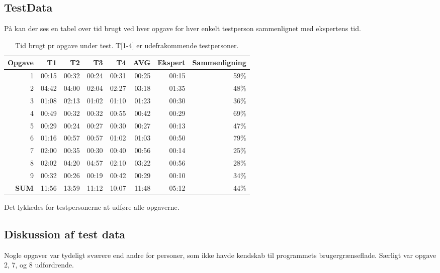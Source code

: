 \subsection{TestData}
På  kan der ses en tabel over tid brugt ved hver opgave for hver enkelt testperson sammenlignet med ekspertens tid.

\begin{table}[htbp]
  \centering
  \caption{Tid brugt pr opgave under test. T[1-4] er udefrakommende testpersoner.}
    \begin{tabular}{r|rrrr|r|r|r}
    \textbf{Opgave} & T1     & T2     & T3     & T4     & \textbf{AVG} & \textbf{Ekspert} & \textbf{Sammenligning} \\ \hline
    1     & 00:15 & 00:32 & 00:24 & 00:31 & 00:25 & 00:15 & 59\% \\
    2     & 04:42 & 04:00 & 02:04 & 02:27 & 03:18 & 01:35 & 48\% \\
    3     & 01:08 & 02:13 & 01:02 & 01:10 & 01:23 & 00:30 & 36\% \\
    4     & 00:49 & 00:32 & 00:32 & 00:55 & 00:42 & 00:29 & 69\% \\
    5     & 00:29 & 00:24 & 00:27 & 00:30 & 00:27 & 00:13 & 47\% \\
    6     & 01:16 & 00:57 & 00:57 & 01:02 & 01:03 & 00:50 & 79\% \\
    7     & 02:00 & 00:35 & 00:30 & 00:40 & 00:56 & 00:14 & 25\% \\
    8     & 02:02 & 04:20 & 04:57 & 02:10 & 03:22 & 00:56 & 28\% \\
    9     & 00:32 & 00:26 & 00:19 & 00:42 & 00:29 & 00:10 & 34\% \\ \hline
    \textbf{SUM} & 11:56 & 13:59 & 11:12 & 10:07 & 11:48 & 05:12 & 44\% \\
    \end{tabular}%
  \label{tab:TestTimeTable}%
\end{table}%

Det lykkedes for testpersonerne at udføre alle opgaverne.

\subsection{Diskussion af test data}

Nogle opgaver var tydeligt sværere end andre for personer, som ikke havde kendskab til programmets brugergrænseflade. 
Særligt var opgave 2, 7, og 8 udfordrende.



